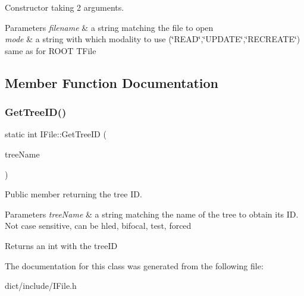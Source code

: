 Constructor taking 2 arguments. 


\begin{DoxyParams}{Parameters}
{\em filename} & a string matching the file to open \\
\hline
{\em mode} & a string with which modality to use (\char`\"{}\+R\+E\+A\+D\char`\"{},\char`\"{}\+U\+P\+D\+A\+T\+E\char`\"{},\char`\"{}\+R\+E\+C\+R\+E\+A\+T\+E\char`\"{}) same as for R\+O\+OT T\+File \\
\hline
\end{DoxyParams}


\subsection{Member Function Documentation}
\mbox{\label{classIFile_a467351b7318960864d75018f2a3b8466}} 
\subsubsection{\texorpdfstring{Get\+Tree\+I\+D()}{GetTreeID()}}
{\footnotesize\ttfamily static int I\+File\+::\+Get\+Tree\+ID (\begin{DoxyParamCaption}\item[{std\+::string}]{tree\+Name }\end{DoxyParamCaption})\hspace{0.3cm}{\ttfamily [static]}}



Public member returning the tree ID. 


\begin{DoxyParams}{Parameters}
{\em tree\+Name} & a string matching the name of the tree to obtain its ID. Not case sensitive, can be hled, bifocal, test, forced \\
\hline
\end{DoxyParams}
\begin{DoxyReturn}{Returns}
an int with the tree\+ID 
\end{DoxyReturn}


The documentation for this class was generated from the following file\+:\begin{DoxyCompactItemize}
\item 
dict/include/I\+File.\+h\end{DoxyCompactItemize}
